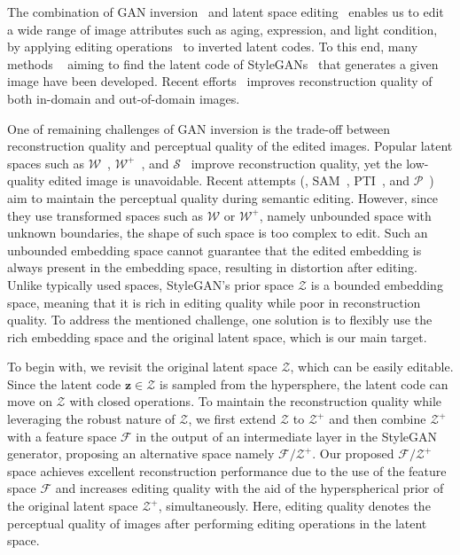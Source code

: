 \documentclass[10pt,twocolumn,letterpaper]{article}
\newcommand{\z}{\bm{z}}
\newcommand{\PS}{\mathcal{P}}
\newcommand{\WS}{\mathcal{W}}
\newcommand{\WPS}{\mathcal{W}^{+}}
\newcommand{\ZS}{\mathcal{Z}}
\newcommand{\ZPS}{\mathcal{Z}^{+}}
\newcommand{\FZS}{\mathcal{F}/\mathcal{Z}^{+}}
\newcommand{\SSp}{\mathcal{S}}
\newcommand{\FS}{\mathcal{F}}
\begin{document}
The combination of GAN inversion~\cite{abdal2019image2stylegan,abdal2020image2stylegan++,Kang_2021_ICCV,feng2022near,roich2021pivotal,xia2022gan,parmar2022spatially,zhu2021barbershop,bermano2022state,zhu2020domain} and latent space editing~\cite{Shen_2020_CVPR,NEURIPS2020_ganspace,Shen_2021_CVPR} enables us to edit a wide range of image attributes such as aging, expression, and light condition, by applying editing operations~\cite{Shen_2020_CVPR,NEURIPS2020_ganspace,Shen_2021_CVPR} to inverted latent codes.
To this end, many methods
~\cite{abdal2019image2stylegan,abdal2020image2stylegan++,Kang_2021_ICCV,feng2022near} aiming to find the latent code of StyleGANs~\cite{Karras2019style,Karras2020analyzing,Karras2020training,Karras2021alias} that generates a given image have been developed. Recent efforts~\cite{tov2021designing,Kang_2021_ICCV,feng2022near,wu2021stylespace} improves
reconstruction quality of both in-domain and out-of-domain images.

One of remaining challenges of GAN inversion is the trade-off between reconstruction quality and perceptual quality of the edited images.
Popular latent spaces such as $\WS$~\cite{Karras2020analyzing}, $\WPS$~\cite{abdal2019image2stylegan}, and $\SSp$~\cite{wu2021stylespace} improve reconstruction quality, yet the low-quality edited image is unavoidable.
Recent attempts (\eg, SAM~\cite{parmar2022spatially}, PTI~\cite{roich2021pivotal}, and $\PS$~\cite{zhu2020improved}) aim to maintain the perceptual quality during semantic editing.
However, since they use transformed spaces such as $\WS$ or $\WPS$, namely unbounded space with unknown boundaries, the shape of such space is too complex to edit.
Such an unbounded embedding space cannot guarantee that the edited embedding is always present in the embedding space, resulting in distortion after editing.
Unlike typically used spaces, StyleGAN's prior space $\ZS$ is a bounded embedding space, meaning that it is rich in editing quality while poor in reconstruction quality.
To address the mentioned challenge, one solution is to flexibly use the rich embedding space and the original latent space, which is our main target. 

To begin with, we revisit the original latent space $\ZS$, which can be easily editable. Since the latent code $\z \in \ZS$ is sampled from the hypersphere, 
the latent code can move on $\ZS$ with closed operations. 
To maintain the reconstruction quality while leveraging the robust nature of $\ZS$, we first extend $\ZS$ to $\ZPS$ and then combine $\ZPS$ with a feature space $\FS$ in the output of an intermediate layer in the StyleGAN generator, proposing an alternative space namely $\FZS$.
Our proposed $\FZS$ space achieves excellent reconstruction performance due to the use of the feature space $\FS$ and increases editing quality with the aid of the hyperspherical prior of the original latent space $\ZPS$, simultaneously. Here, editing quality denotes the perceptual quality of images after performing editing operations in the latent space.
\end{document}
